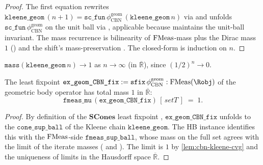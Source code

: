 \begin{proof}
The first equation rewrites
$\texttt{kleene\_geom}\,(n+1) = \texttt{sc\_fun}\,
\phi_{\mathrm{CBN}}^{\mathrm{geom}}\,(\texttt{kleene\_geom}\,n)$ via
 and unfolds
$\texttt{sc\_fun}\,\phi_{\mathrm{CBN}}^{\mathrm{geom}}$ on the unit
ball via , applicable
because  maintains
the unit-ball invariant. The mass recurrence is bilinearity of
$\mathrm{FMeas}$-mass plus the Dirac mass $1$
() and the shift's
mass-preservation .
The closed-form is induction on $n$.
\end{proof}

\begin{lemma}\label{lem:cbn-kleene-cvg}
\rocqok
{}
$\texttt{mass}(\texttt{kleene\_geom}\,n) \to 1$ as $n \to \infty$
(in $\overline{\mathbb{R}}$), since $(1/2)^n \to 0$.
\end{lemma}

\begin{theorem}%
\label{thm:cbn-ex-geom}
\rocqok
{}\rocqok
{}
The least fixpoint
$\texttt{ex\_geom\_CBN\_fix} := \texttt{sfix}\,
\phi_{\mathrm{CBN}}^{\mathrm{geom}} : \FMeas(\Robj)$
of the geometric body operator has total mass $1$ in
$\overline{\mathbb{R}}$:
\[
  \texttt{fmeas\_mu}\,(\texttt{ex\_geom\_CBN\_fix})\,[\,\mathit{setT}\,]
  \;=\;
  1.
\]
\end{theorem}

\begin{proof}
By definition of the $\mathbf{SCones}$ least fixpoint
, $\texttt{ex\_geom\_CBN\_fix}$
unfolds to the $\texttt{cone\_sup\_ball}$ of the Kleene chain
$\texttt{kleene\_geom}$. The HB instance identifies this with the
$\mathrm{FMeas}$-side $\texttt{fmeas\_sup\_ball}$, whose mass on the full set
agrees with the limit of the iterate masses
( and
). The limit is $1$ by
\autoref{lem:cbn-kleene-cvg} and the uniqueness of limits in the
Hausdorff space $\overline{\mathbb{R}}$.
\end{proof}

